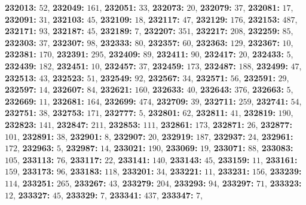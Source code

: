 \textsf{\bfseries 232013:} $52$, \textsf{\bfseries 232049:} $161$, \textsf{\bfseries 232051:} $33$, \textsf{\bfseries 232073:} $20$, \textsf{\bfseries 232079:} $37$, \textsf{\bfseries 232081:} $17$, \textsf{\bfseries 232091:} $31$, \textsf{\bfseries 232103:} $45$, \textsf{\bfseries 232109:} $18$, \textsf{\bfseries 232117:} $47$, \textsf{\bfseries 232129:} $176$, \textsf{\bfseries 232153:} $487$, \textsf{\bfseries 232171:} $93$, \textsf{\bfseries 232187:} $45$, \textsf{\bfseries 232189:} $7$, \textsf{\bfseries 232207:} $351$, \textsf{\bfseries 232217:} $208$, \textsf{\bfseries 232259:} $85$, \textsf{\bfseries 232303:} $37$, \textsf{\bfseries 232307:} $98$, \textsf{\bfseries 232333:} $80$, \textsf{\bfseries 232357:} $60$, \textsf{\bfseries 232363:} $129$, \textsf{\bfseries 232367:} $10$, \textsf{\bfseries 232381:} $170$, \textsf{\bfseries 232391:} $295$, \textsf{\bfseries 232409:} $89$, \textsf{\bfseries 232411:} $90$, \textsf{\bfseries 232417:} $20$, \textsf{\bfseries 232433:} $5$, \textsf{\bfseries 232439:} $182$, \textsf{\bfseries 232451:} $10$, \textsf{\bfseries 232457:} $37$, \textsf{\bfseries 232459:} $173$, \textsf{\bfseries 232487:} $188$, \textsf{\bfseries 232499:} $47$, \textsf{\bfseries 232513:} $43$, \textsf{\bfseries 232523:} $51$, \textsf{\bfseries 232549:} $92$, \textsf{\bfseries 232567:} $34$, \textsf{\bfseries 232571:} $56$, \textsf{\bfseries 232591:} $29$, \textsf{\bfseries 232597:} $14$, \textsf{\bfseries 232607:} $84$, \textsf{\bfseries 232621:} $160$, \textsf{\bfseries 232633:} $40$, \textsf{\bfseries 232643:} $376$, \textsf{\bfseries 232663:} $5$, \textsf{\bfseries 232669:} $11$, \textsf{\bfseries 232681:} $164$, \textsf{\bfseries 232699:} $474$, \textsf{\bfseries 232709:} $39$, \textsf{\bfseries 232711:} $259$, \textsf{\bfseries 232741:} $54$, \textsf{\bfseries 232751:} $38$, \textsf{\bfseries 232753:} $171$, \textsf{\bfseries 232777:} $5$, \textsf{\bfseries 232801:} $62$, \textsf{\bfseries 232811:} $41$, \textsf{\bfseries 232819:} $190$, \textsf{\bfseries 232823:} $141$, \textsf{\bfseries 232847:} $211$, \textsf{\bfseries 232853:} $111$, \textsf{\bfseries 232861:} $173$, \textsf{\bfseries 232871:} $26$, \textsf{\bfseries 232877:} $101$, \textsf{\bfseries 232891:} $38$, \textsf{\bfseries 232901:} $8$, \textsf{\bfseries 232907:} $20$, \textsf{\bfseries 232919:} $187$, \textsf{\bfseries 232937:} $24$, \textsf{\bfseries 232961:} $172$, \textsf{\bfseries 232963:} $5$, \textsf{\bfseries 232987:} $14$, \textsf{\bfseries 233021:} $190$, \textsf{\bfseries 233069:} $19$, \textsf{\bfseries 233071:} $88$, \textsf{\bfseries 233083:} $105$, \textsf{\bfseries 233113:} $76$, \textsf{\bfseries 233117:} $22$, \textsf{\bfseries 233141:} $140$, \textsf{\bfseries 233143:} $45$, \textsf{\bfseries 233159:} $11$, \textsf{\bfseries 233161:} $159$, \textsf{\bfseries 233173:} $96$, \textsf{\bfseries 233183:} $118$, \textsf{\bfseries 233201:} $34$, \textsf{\bfseries 233221:} $11$, \textsf{\bfseries 233231:} $156$, \textsf{\bfseries 233239:} $114$, \textsf{\bfseries 233251:} $265$, \textsf{\bfseries 233267:} $43$, \textsf{\bfseries 233279:} $204$, \textsf{\bfseries 233293:} $94$, \textsf{\bfseries 233297:} $71$, \textsf{\bfseries 233323:} $12$, \textsf{\bfseries 233327:} $45$, \textsf{\bfseries 233329:} $7$, \textsf{\bfseries 233341:} $437$, \textsf{\bfseries 233347:} $7$, 
